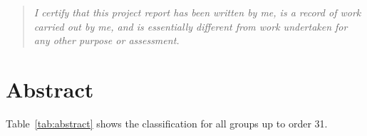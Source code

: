 \begin{quote}
\itshape%
I certify that this project report has been written by me, is a record of work carried
out by me, and is essentially different from work undertaken for any other purpose
or assessment.
\end{quote}

\section{Abstract}
Table~\ref{tab:abstract} shows the classification for all groups up to order 31.

\begin{table}
    \caption{Classification of Groups up to Order 31}\label{tab:abstract}
    \begin{center}

\end{center}
\end{table}
